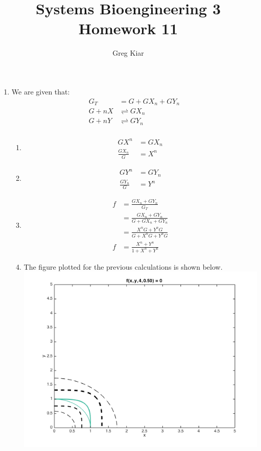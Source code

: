 \documentclass[10pt]{article}
\begin{document}
\title{ \vspace{-30mm}Systems Bioengineering 3\\Homework 11}
\author{Greg Kiar}

\maketitle
\begin{enumerate}


\item We are given that: \begin{align*} G_T &= G + GX_n + GY_n \\ G + nX &\rightleftharpoons GX_n \\ G + nY &\rightleftharpoons GY_n \\ \end{align*}
\begin{enumerate}
\item \begin{align*} GX^n &= G X_n \\ \frac{GX_n}{G} &= X^n \end{align*}
\item \begin{align*} GY^n &= G Y_n \\ \frac{GY_n}{G} &= Y^n \end{align*}
\item \begin{align*} f &= \frac {GX_n + GY_n}{G_T} \\ &= \frac {GX_n + GY_n}{G + GX_n + GY_n} \\ &= \frac {X^nG + Y^nG}{G + X^nG + Y^nG} \\ f &= \frac{X^n + Y^n}{1 + X^n + Y^n} \end{align*}
\item The figure plotted for the previous calculations is shown below.\\ \includegraphics[scale=0.4]{hw11q1d.png}

\end{enumerate}
\end{enumerate}
\end{document}
